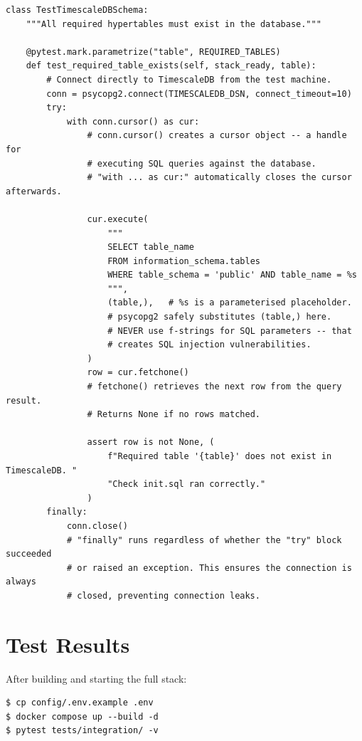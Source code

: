\documentclass[12pt, a4paper]{article}
\begin{document}
\begin{lstlisting}[style=python, caption={test\_pipeline\_health.py --- Layer 7: Database Schema}]
class TestTimescaleDBSchema:
    """All required hypertables must exist in the database."""

    @pytest.mark.parametrize("table", REQUIRED_TABLES)
    def test_required_table_exists(self, stack_ready, table):
        # Connect directly to TimescaleDB from the test machine.
        conn = psycopg2.connect(TIMESCALEDB_DSN, connect_timeout=10)
        try:
            with conn.cursor() as cur:
                # conn.cursor() creates a cursor object -- a handle for
                # executing SQL queries against the database.
                # "with ... as cur:" automatically closes the cursor afterwards.

                cur.execute(
                    """
                    SELECT table_name
                    FROM information_schema.tables
                    WHERE table_schema = 'public' AND table_name = %s
                    """,
                    (table,),   # %s is a parameterised placeholder.
                    # psycopg2 safely substitutes (table,) here.
                    # NEVER use f-strings for SQL parameters -- that
                    # creates SQL injection vulnerabilities.
                )
                row = cur.fetchone()
                # fetchone() retrieves the next row from the query result.
                # Returns None if no rows matched.

                assert row is not None, (
                    f"Required table '{table}' does not exist in TimescaleDB. "
                    "Check init.sql ran correctly."
                )
        finally:
            conn.close()
            # "finally" runs regardless of whether the "try" block succeeded
            # or raised an exception. This ensures the connection is always
            # closed, preventing connection leaks.
\end{lstlisting}

\section{Test Results}

After building and starting the full stack:

\begin{lstlisting}[style=bash]
$ cp config/.env.example .env
$ docker compose up --build -d
$ pytest tests/integration/ -v
\end{lstlisting}
\end{document}

